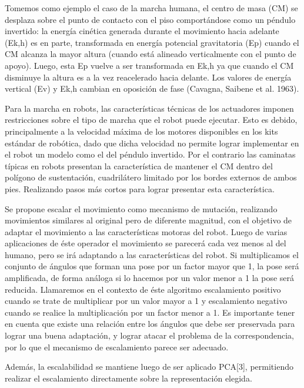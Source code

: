 \documentclass[
  twoside,
  11pt, a4paper,
  footinclude=true,
  headinclude=true,
  cleardoublepage=empty
]{scrbook}
\begin{document}
Tomemos como ejemplo el caso de la marcha humana, el centro de masa (CM) se desplaza sobre el punto de contacto con el piso comportándose como un péndulo invertido: la energía cinética generada durante el movimiento hacia adelante (Ek,h) es en parte, transformada en energía potencial gravitatoria (Ep) cuando el CM alcanza la mayor altura (cuando está alineado verticalmente con el punto de apoyo). Luego, esta Ep vuelve a ser transformada en Ek,h ya que cuando el CM disminuye la altura es a la vez reacelerado hacia delante. Los valores de energía vertical (Ev) y Ek,h cambian en oposición de fase (Cavagna, Saibene et al. 1963). 

Para la marcha en robots, las características técnicas de los actuadores imponen restricciones sobre el tipo de marcha que el robot puede ejecutar. Esto es debido, principalmente a la velocidad máxima de los motores disponibles en los kits estándar de robótica, dado que dicha velocidad no permite lograr implementar en el robot un modelo como el del péndulo invertido. Por el contrario las caminatas típicas en robots presentan la característica de mantener el CM dentro del polígono de sustentación, cuadrilátero limitado por los bordes externos de ambos pies. Realizando pasos más cortos para lograr presentar esta característica.

Se propone escalar el movimiento como mecanismo de mutación, realizando movimientos similares al original pero de diferente magnitud\cite{5354391}, con el objetivo de adaptar el movimiento a las características motoras del robot. Luego de varias aplicaciones de éste operador el movimiento se parecerá cada vez menos al del humano, pero se irá adaptando a las características del robot. Si multiplicamos el conjunto de ángulos que forman una pose por un factor mayor que 1, la pose será amplificada, de forma análoga si lo hacemos por un valor menor a 1 la pose será reducida. Llamaremos en el contexto de éste algoritmo escalamiento positivo cuando se trate de multiplicar por un valor mayor a 1 y escalamiento negativo cuando se realice la multiplicación por un factor menor a 1. 
Es importante tener en cuenta que existe una relación entre los ángulos que debe ser preservada para lograr una buena adaptación, y lograr atacar el problema de la correspondencia, por lo que el mecanismo de escalamiento parece ser adecuado. 

Además, la escalabilidad se mantiene luego de ser aplicado PCA[3], permitiendo realizar el escalamiento directamente sobre la representación elegida.
\end{document}
